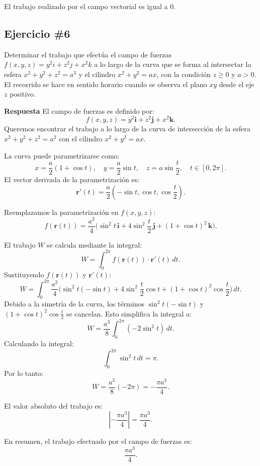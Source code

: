 \documentclass{report}
\begin{document}
El trabajo realizado por el campo vectorial es igual a 0.

\newpage

\subsection*{Ejercicio \#6}
Determinar el trabajo que efectúa el campo de fuerzas $f(x, y, z) = y^2 i + z^2 j + x^2 k$ a lo largo de la curva que se forma al intersectar la esfera $x^2 + y^2 + z^2 = a^3$ y el cilindro $x^2 + y^2 = ax$, con la condición $z \geq 0$ y $a > 0$. El recorrido se hace en sentido horario cuando se observa el plano $xy$ desde el eje $z$ positivo.

\textbf{Respuesta}
El campo de fuerzas es definido por:
\[
f(x, y, z) = y^2 \mathbf{i} + z^2 \mathbf{j} + x^2 \mathbf{k}.
\]
Queremos encontrar el trabajo a lo largo de la curva de intersección de la esfera \( x^2 + y^2 + z^2 = a^2 \) con el cilindro \( x^2 + y^2 = ax \).



La curva puede parametrizarse como:
\[
x = \frac{a}{2}(1 + \cos t), \quad y = \frac{a}{2} \sin t, \quad z = a \sin \frac{t}{2}, \quad t \in [0, 2\pi].
\]
El vector derivada de la parametrización es:
\[
\mathbf{r}'(t) = \frac{a}{2}(-\sin t, \cos t, \cos \frac{t}{2}).
\]



Reemplazamos la parametrización en \( f(x, y, z) \):
\[
f(\mathbf{r}(t)) = \frac{a^2}{4} \big(\sin^2 t \, \mathbf{i} + 4 \sin^2 \frac{t}{2} \, \mathbf{j} + (1 + \cos t)^2 \, \mathbf{k}\big).
\]



El trabajo \( W \) se calcula mediante la integral:
\[
W = \int_0^{2\pi} f(\mathbf{r}(t)) \cdot \mathbf{r}'(t) \, dt.
\]
Sustituyendo \( f(\mathbf{r}(t)) \) y \( \mathbf{r}'(t) \):
\[
W = \int_0^{2\pi} \frac{a^2}{4} \big(\sin^2 t (-\sin t) + 4 \sin^2 \frac{t}{2} \cos t + (1+\cos t)^2 \cos \frac{t}{2}\big) \, dt.
\]
Debido a la simetría de la curva, los términos \(\sin^2 t (-\sin t)\) y \((1+\cos t)^2 \cos \frac{t}{2}\) se cancelan. Esto simplifica la integral a:
\[
W = \frac{a^3}{8} \int_0^{2\pi} (-2\sin^2 t) \, dt.
\]
Calculando la integral:
\[
\int_0^{2\pi} \sin^2 t \, dt = \pi.
\]
Por lo tanto:
\[
W = \frac{a^3}{8}(-2\pi) = -\frac{\pi a^3}{4}.
\]



El valor absoluto del trabajo es:
\[
\left|-\frac{\pi a^3}{4}\right| = \frac{\pi a^3}{4}.
\]

En resumen, el trabajo efectuado por el campo de fuerzas es:
\[
{\frac{\pi a^3}{4}}.
\]
\newpage
\end{document}
